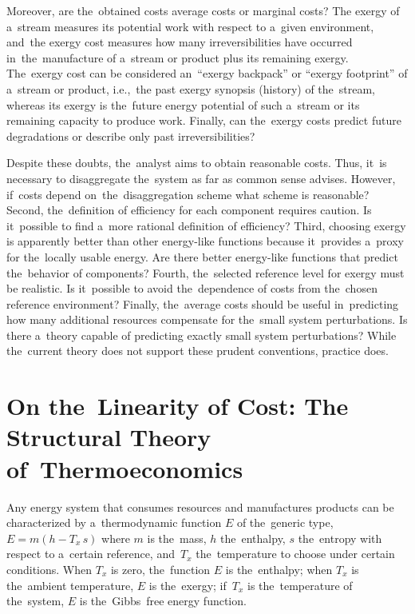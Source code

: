 \documentclass[energies,article,accept,moreauthors,pdftex]{Definitions/mdpi}
\begin{document}
Moreover, are the~obtained costs average costs or marginal costs? The exergy of a~stream measures its potential work with respect to a~given environment, and~the exergy cost measures how many irreversibilities have occurred in~the~manufacture of a~stream or product plus its remaining exergy. The~exergy cost can be considered an~“exergy backpack” or “exergy footprint” of a~stream or product, i.e.,~the past exergy synopsis (history) of the~stream, whereas its exergy is the~future energy potential of such a~stream or its remaining capacity to produce work. Finally, can the~exergy costs predict future degradations or describe only past irreversibilities?

Despite these doubts, the~analyst aims to obtain reasonable costs. Thus, it~is necessary to disaggregate the~system as far as common sense advises. However, if~costs depend on~the~disaggregation scheme what scheme is reasonable? Second, the~definition of efficiency for each component requires caution. Is it~possible to find a~more rational definition of efficiency? Third, choosing exergy is apparently better than other energy-like functions because it~provides a~proxy for the~locally usable energy. Are there better energy-like functions that predict the~behavior of components? Fourth, the~selected reference level for exergy must be realistic. Is it~possible to avoid the~dependence of costs from the~chosen reference environment? Finally, the~average costs should be useful in~predicting how many additional resources compensate for the~small system perturbations. Is there a~theory capable of predicting  exactly small system perturbations? While the~current theory does not support these prudent conventions, practice does.

\section{On the~Linearity of Cost: The Structural Theory of~Thermoeconomics}
Any energy system that consumes resources and manufactures products can be characterized by a~thermodynamic function $E$ of the~generic type, $E = m (h-T_x\,s)$ where $m$ is the~mass, $h$ the~enthalpy, $s$ the~entropy with respect to a~certain reference, and~$T_x$ the~temperature to choose under certain conditions. When $T_x$ is zero, the~function $E$ is the~enthalpy; when $T_x$ is the~ambient temperature, $E$ is the~exergy; if~$T_x$ is the~temperature of the~system, $E$ is the~Gibbs~free energy function.
\end{document}
